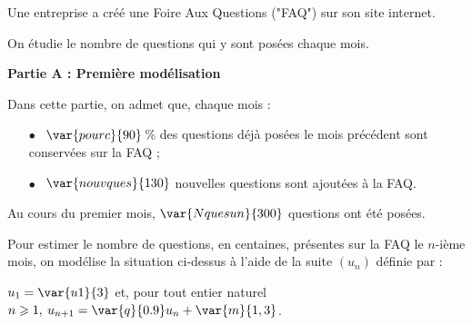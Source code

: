 \EXERCICE {}

\medskip

Une entreprise a créé une Foire Aux Questions ("FAQ") sur son site internet.

\medskip

On étudie le nombre de questions qui y sont posées chaque mois.

\bigskip

\textbf{Partie A : Première modélisation}

\medskip

Dans cette partie, on admet que, chaque mois :

\begin{itemize}
\item[$\bullet~~$]$\var{pourc}{90}$\,\% des questions déjà posées le mois précédent sont conservées sur la FAQ ;
\item[$\bullet~~$]$\var{nouvques}{130}$ nouvelles questions sont ajoutées à la FAQ.
\end{itemize}

Au cours du premier mois, $\var{Nquesun}{300}$ questions ont été posées.

\medskip

Pour estimer le nombre de questions, en centaines, présentes sur la FAQ le $n$-ième
mois, on modélise la situation ci-dessus à l'aide de la suite $\left(u_n\right)$ définie par : 
\begin{center}$u_1 =\var{u1}{3}$ \quad et, pour tout entier naturel $n \geqslant 1,\:u_{n+1} = \var{q}{0.9}u_n + \var{m}{1,3}$.
\end{center}

\smallskip

